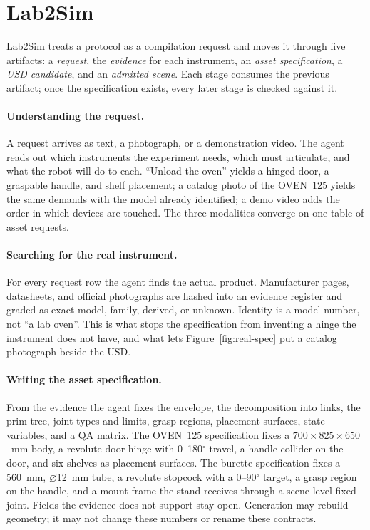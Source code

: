 \section{Lab2Sim}
\label{sec:method}

Lab2Sim treats a protocol as a compilation request and moves it through five
artifacts: a \emph{request}, the \emph{evidence} for each instrument, an
\emph{asset specification}, a \emph{USD candidate}, and an \emph{admitted
scene}. Each stage consumes the previous artifact; once the specification
exists, every later stage is checked against it.

\paragraph{Understanding the request.}
A request arrives as text, a photograph, or a demonstration video. The agent
reads out which instruments the experiment needs, which must articulate, and
what the robot will do to each. ``Unload the oven'' yields a hinged door, a
graspable handle, and shelf placement; a catalog photo of the OVEN~125 yields
the same demands with the model already identified; a demo video adds the
order in which devices are touched. The three modalities converge on one
table of asset requests.

\paragraph{Searching for the real instrument.}
For every request row the agent finds the actual product. Manufacturer pages,
datasheets, and official photographs are hashed into an evidence register and
graded as exact-model, family, derived, or unknown. Identity is a model
number, not ``a lab oven''. This is what stops the specification from
inventing a hinge the instrument does not have, and what lets
Figure~\ref{fig:real-spec} put a catalog photograph beside the USD.

\paragraph{Writing the asset specification.}
From the evidence the agent fixes the envelope, the decomposition into links,
the prim tree, joint types and limits, grasp regions, placement surfaces,
state variables, and a QA matrix. The OVEN~125 specification fixes a
$700{\times}825{\times}650$~mm body, a revolute door hinge with
0--180$^{\circ}$ travel, a handle collider on the door, and six shelves as
placement surfaces. The burette specification fixes a 560~mm,
$\varnothing$12~mm tube, a revolute stopcock with a 0--90$^{\circ}$ target, a
grasp region on the handle, and a mount frame the stand receives through a
scene-level fixed joint. Fields the evidence does not support stay open.
Generation may rebuild geometry; it may not change these numbers or rename
these contracts.

